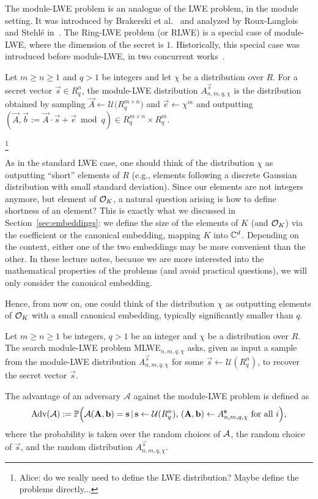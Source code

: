 The module-LWE problem is an analogue of the LWE problem, in the module setting. It was introduced by Brakerski et al.~\cite{MLWE1} and analyzed by Roux-Langlois and Stehlé in~\cite{MLWE2}. The Ring-LWE problem (or RLWE) is a special case of module-LWE, where the dimension of the secret is $1$. Historically, this special case was introduced before module-LWE, in two concurrent works~\cite{RLWE1, RLWE2}.

\begin{definition}
Let $m \geq n \geq 1$ and $q > 1$ be integers and let $\chi$ be a distribution over $R$. For a secret vector $\vec s \in R_q^n$, the module-LWE distribution $A^{\vec s}_{n,m,q,\chi}$ is the distribution obtained by sampling $\vec A \leftarrow \mathcal{U}\Big(R_q^{m \times n}\Big)$ and $\vec e \leftarrow \chi^m$ and outputting $(\vec A, \vec b := \vec A \cdot \vec s + \vec e \bmod q) \in R_q^{m \times n} \times R_q^m$.
\end{definition}

\footnote{Alice: do we really need to define the LWE distribution? Maybe define the problems directly...}

As in the standard LWE case, one should think of the distribution $\chi$ as outputting ``short'' elements of $R$ (e.g., elements following a discrete Gaussian distribution with small standard deviation). Since our elements are not integers anymore, but element of $\mathcal{O}_K$, a natural question arising is how to define shortness of an element? This is exactly what we discussed in Section~\ref{sec:embeddings}: we define the size of the elements of $K$ (and $\mathcal{O}_K$) via the coefficient or the canonical embedding, mapping $K$ into $\mathbb{C}^d$. Depending on the context, either one of the two embeddings may be more convenient than the other. In these lecture notes, because we are more interested into the mathematical properties of the problems (and avoid practical questions), we will only consider the canonical embedding.

Hence, from now on, one could think of the distribution $\chi$ as outputting elements of $\mathcal{O}_K$ with a small canonical embedding, typically significantly smaller than $q$.

\begin{definition}
Let $m \geq n \geq 1$ be integers, $q >1$ be an integer and $\chi$ be a distribution over $R$. The search module-LWE problem MLWE$_{n,m,q,\chi}$ asks, given as input a sample from the module-LWE distribution $A^{\vec s}_{n,m,q,\chi}$ for some $\vec s \leftarrow \mathcal{U}(R_q^n)$, to recover the secret vector $\vec s$.

The advantage of an adversary $\mathcal{A}$ against the module-LWE problem is defined as
\[ \operatorname{Adv}(\mathcal{A}) := \mathbb{P}\Big(\mathcal{A}(\mathbf A, \mathbf b) = \mathbf s\,|\, \mathbf s \leftarrow \mathcal{U}(R_q^n),\, (\mathbf A, \mathbf b) \leftarrow A^{\mathbf s}_{n,m,q,\chi} \text{ for all }i\Big), \]
where the probability is taken over the random choices of $\mathcal{A}$, the random choice of $\vec s$, and the random distribution $A^{\vec s}_{n,m,q,\chi}$.
\end{definition}

